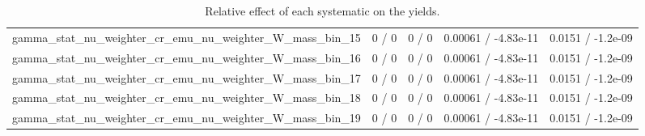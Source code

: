 \documentclass[10pt]{article}
\begin{document}
\begin{table}[htbp]
\begin{center}
\begin{tabular}{|c|c|c|c|c|}
  gamma_stat_nu_weighter_cr_emu_nu_weighter_W_mass_bin_15 & 0 / 0 & 0 / 0 & 0.00061 / -4.83e-11 & 0.0151 / -1.2e-09 \\ 
  gamma_stat_nu_weighter_cr_emu_nu_weighter_W_mass_bin_16 & 0 / 0 & 0 / 0 & 0.00061 / -4.83e-11 & 0.0151 / -1.2e-09 \\ 
  gamma_stat_nu_weighter_cr_emu_nu_weighter_W_mass_bin_17 & 0 / 0 & 0 / 0 & 0.00061 / -4.83e-11 & 0.0151 / -1.2e-09 \\ 
  gamma_stat_nu_weighter_cr_emu_nu_weighter_W_mass_bin_18 & 0 / 0 & 0 / 0 & 0.00061 / -4.83e-11 & 0.0151 / -1.2e-09 \\ 
  gamma_stat_nu_weighter_cr_emu_nu_weighter_W_mass_bin_19 & 0 / 0 & 0 / 0 & 0.00061 / -4.83e-11 & 0.0151 / -1.2e-09 \\ 
\hline 
\end{tabular} 
\caption{Relative effect of each systematic on the yields.} 
\end{center} 
\end{table} 
\end{document}
